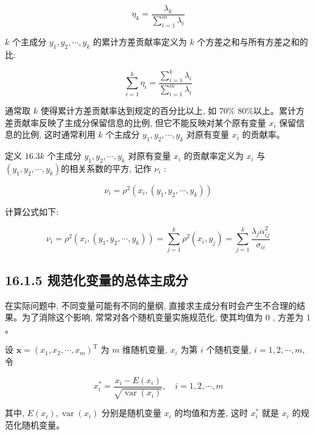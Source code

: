 \documentclass[10pt]{article}
\begin{document}
\begin{equation*}
\eta_{k}=\frac{\lambda_{k}}{\sum_{i=1}^{m} \lambda_{i}} \tag{16.30}
\end{equation*}


$k$ 个主成分 $y_{1}, y_{2}, \cdots, y_{k}$ 的累计方差贡献率定义为 $k$ 个方差之和与所有方差之和的比:


\begin{equation*}
\sum_{i=1}^{k} \eta_{i}=\frac{\sum_{i=1}^{k} \lambda_{i}}{\sum_{i=1}^{m} \lambda_{i}} \tag{16.31}
\end{equation*}


通常取 $k$ 使得累计方差贡献率达到规定的百分比以上, 如 70\% 80\%以上。累计方差贡献率反映了主成分保留信息的比例, 但它不能反映对某个原有变量 $x_{i}$ 保留信息的比例, 这时通常利用 $k$ 个主成分 $y_{1}, y_{2}, \cdots, y_{k}$ 对原有变量 $x_{i}$ 的贡献率。

定义 $16.3 k$ 个主成分 $y_{1}, y_{2}, \cdots, y_{k}$ 对原有变量 $x_{i}$ 的贡献率定义为 $x_{i}$ 与 $\left(y_{1}, y_{2}, \cdots, y_{k}\right)$的相关系数的平方, 记作 $\nu_{i}$ :

$$
\nu_{i}=\rho^{2}\left(x_{i},\left(y_{1}, y_{2}, \cdots, y_{k}\right)\right)
$$

计算公式如下:


\begin{equation*}
\nu_{i}=\rho^{2}\left(x_{i},\left(y_{1}, y_{2}, \cdots, y_{k}\right)\right)=\sum_{j=1}^{k} \rho^{2}\left(x_{i}, y_{j}\right)=\sum_{j=1}^{k} \frac{\lambda_{j} \alpha_{i j}^{2}}{\sigma_{i i}} \tag{16.32}
\end{equation*}


\subsection*{16.1.5 规范化变量的总体主成分}
在实际问题中, 不同变量可能有不同的量纲, 直接求主成分有时会产生不合理的结果。为了消除这个影响, 常常对各个随机变量实施规范化, 使其均值为 0 , 方差为 1 。

设 $\boldsymbol{x}=\left(x_{1}, x_{2}, \cdots, x_{m}\right)^{\mathrm{T}}$ 为 $m$ 维随机变量, $x_{i}$ 为第 $i$ 个随机变量, $i=1,2, \cdots, m$, 令


\begin{equation*}
x_{i}^{*}=\frac{x_{i}-E\left(x_{i}\right)}{\sqrt{\operatorname{var}\left(x_{i}\right)}}, \quad i=1,2, \cdots, m \tag{16.33}
\end{equation*}


其中, $E\left(x_{i}\right), \operatorname{var}\left(x_{i}\right)$ 分别是随机变量 $x_{i}$ 的均值和方差, 这时 $x_{i}^{*}$ 就是 $x_{i}$ 的规范化随机变量。
\end{document}
